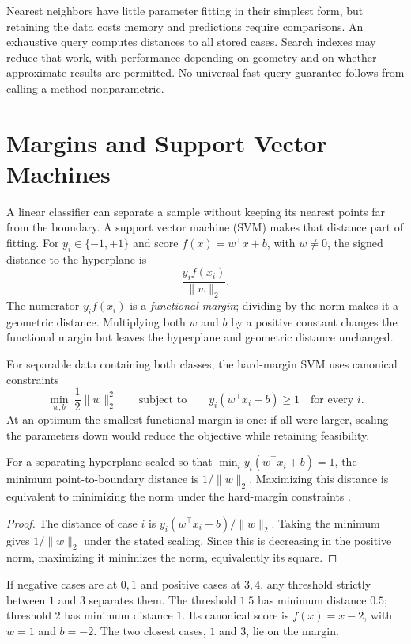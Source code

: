 Nearest neighbors have little parameter fitting in their simplest form, but retaining the data costs memory and predictions require comparisons. An exhaustive query computes distances to all stored cases. Search indexes may reduce that work, with performance depending on geometry and on whether approximate results are permitted. No universal fast-query guarantee follows from calling a method nonparametric.

\section{Margins and Support Vector Machines}

A linear classifier can separate a sample without keeping its nearest points far from the boundary. A support vector machine (SVM) makes that distance part of fitting. For $y_i\in\{-1,+1\}$ and score $f(x)=w^\top x+b$, with $w\ne0$, the signed distance to the hyperplane is
\[
\frac{y_i f(x_i)}{\|w\|_2}.
\]
The numerator $y_i f(x_i)$ is a \emph{functional margin}; dividing by the norm makes it a geometric distance. Multiplying both $w$ and $b$ by a positive constant changes the functional margin but leaves the hyperplane and geometric distance unchanged.

For separable data containing both classes, the hard-margin SVM uses canonical constraints
\[
\min_{w,b}\ \frac12\|w\|_2^2
\qquad\text{subject to}\qquad y_i(w^\top x_i+b)\ge1\quad\text{for every }i.
\]
At an optimum the smallest functional margin is one: if all were larger, scaling the parameters down would reduce the objective while retaining feasibility.

\begin{theorem}
For a separating hyperplane scaled so that $\min_i y_i(w^\top x_i+b)=1$, the minimum point-to-boundary distance is $1/\|w\|_2$. Maximizing this distance is equivalent to minimizing the norm under the hard-margin constraints \citep{cortes1995}.
\end{theorem}
\begin{proof}
The distance of case $i$ is $y_i(w^\top x_i+b)/\|w\|_2$. Taking the minimum gives $1/\|w\|_2$ under the stated scaling. Since this is decreasing in the positive norm, maximizing it minimizes the norm, equivalently its square.
\end{proof}

If negative cases are at $0,1$ and positive cases at $3,4$, any threshold strictly between $1$ and $3$ separates them. The threshold $1.5$ has minimum distance $0.5$; threshold $2$ has minimum distance $1$. Its canonical score is $f(x)=x-2$, with $w=1$ and $b=-2$. The two closest cases, $1$ and $3$, lie on the margin.

